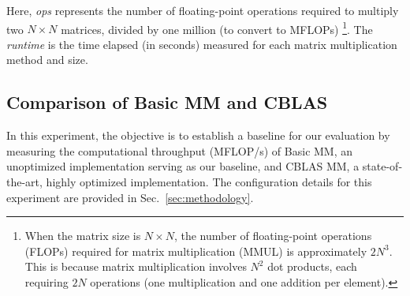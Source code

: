 Here, \textit{ops} represents the number of floating-point operations required to multiply two \(N \times N\) matrices, divided by one million (to convert to MFLOPs) \footnote{When the matrix size is \(N \times N\), the number of floating-point operations (FLOPs) required for matrix multiplication (MMUL) is approximately \(2N^3\). This is because matrix multiplication involves \(N^2\) dot products, each requiring \(2N\) operations (one multiplication and one addition per element).}. The \textit{runtime} is the time elapsed (in seconds) measured for each matrix multiplication method and size.


\subsection{Comparison of Basic MM and CBLAS}
\label{subsec:basic-and-cblas}

In this experiment, the objective is to establish a baseline for our evaluation by measuring the computational throughput (MFLOP/s) of Basic MM, an unoptimized implementation serving as our baseline, and CBLAS MM, a state-of-the-art, highly optimized implementation. The configuration details for this experiment are provided in Sec.~\ref{sec:methodology}.

